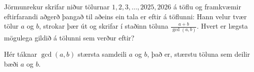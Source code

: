 Jörmunrekur skrifar niður tölurnar $1,2,3,\ldots,2025,2026$ á töflu og framkvæmir eftirfarandi aðgerð þangað til aðeins ein tala er eftir á töflunni:
Hann velur tvær tölur $a$ og $b$, strokar þær út og skrifar í staðinn töluna $\frac{a+b}{\gcd(a,b)}$. Hvert er lægsta mögulega gildið á tölunni sem verður eftir?

Hér táknar $\gcd(a,b)$ stærsta samdeili $a$ og $b$, það er, stærstu töluna sem deilir bæði $a$ og $b$.